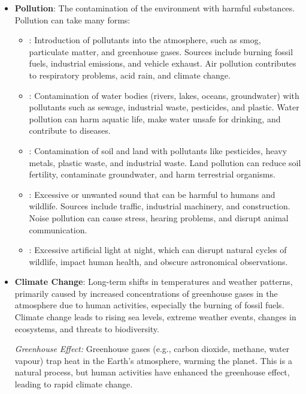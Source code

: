 \begin{itemize}
    \item \textbf{Pollution}:  The contamination of the environment with harmful substances. Pollution can take many forms:
        \begin{itemize}
            \item {}:  Introduction of pollutants into the atmosphere, such as smog, particulate matter, and greenhouse gases. Sources include burning fossil fuels, industrial emissions, and vehicle exhaust.  Air pollution contributes to respiratory problems, acid rain, and climate change.
            \item {}: Contamination of water bodies (rivers, lakes, oceans, groundwater) with pollutants such as sewage, industrial waste, pesticides, and plastic. Water pollution can harm aquatic life, make water unsafe for drinking, and contribute to diseases.
            \item {}: Contamination of soil and land with pollutants like pesticides, heavy metals, plastic waste, and industrial waste. Land pollution can reduce soil fertility, contaminate groundwater, and harm terrestrial organisms.
            \item {}: Excessive or unwanted sound that can be harmful to humans and wildlife. Sources include traffic, industrial machinery, and construction. Noise pollution can cause stress, hearing problems, and disrupt animal communication.
            \item {}: Excessive artificial light at night, which can disrupt natural cycles of wildlife, impact human health, and obscure astronomical observations.
        \end{itemize}
    \item \textbf{Climate Change}: Long-term shifts in temperatures and weather patterns, primarily caused by increased concentrations of greenhouse gases in the atmosphere due to human activities, especially the burning of fossil fuels. Climate change leads to rising sea levels, extreme weather events, changes in ecosystems, and threats to biodiversity.

    \begin{marginnote}
    \textit{Greenhouse Effect:}  Greenhouse gases (e.g., carbon dioxide, methane, water vapour) trap heat in the Earth's atmosphere, warming the planet.  This is a natural process, but human activities have enhanced the greenhouse effect, leading to rapid climate change. 
    \end{marginnote}


\end{itemize}
